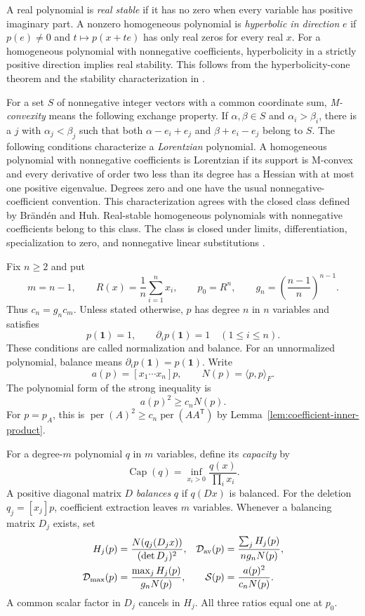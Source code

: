 \documentclass[11pt,a4paper]{article}
\theoremstyle{definition}
\theoremstyle{remark}
\newcommand{\per}{\operatorname{per}}
\newcommand{\T}{\mathsf{T}}
\begin{document}
A real polynomial is \emph{real stable} if it has no zero when every variable has positive imaginary part.
A nonzero homogeneous polynomial is \emph{hyperbolic in direction} $e$ if $p(e)\ne0$ and $t\mapsto p(x+te)$ has only real zeros for every real $x$.
For a homogeneous polynomial with nonnegative coefficients, hyperbolicity in a strictly positive direction implies real stability.
This follows from the hyperbolicity-cone theorem and the stability characterization in \citet[Proposition~4.4 and Theorem~4.5]{borcea-branden-liggett2009}.

For a set $S$ of nonnegative integer vectors with a common coordinate sum, \emph{M-convexity} means the following exchange property.
If $\alpha,\beta\in S$ and $\alpha_i>\beta_i$, there is a $j$ with $\alpha_j<\beta_j$ such that both $\alpha-e_i+e_j$ and $\beta+e_i-e_j$ belong to $S$.
The following conditions characterize a \emph{Lorentzian} polynomial.
A homogeneous polynomial with nonnegative coefficients is Lorentzian if its support is M-convex and every derivative of order two less than its degree has a Hessian with at most one positive eigenvalue.
Degrees zero and one have the usual nonnegative-coefficient convention.
This characterization agrees with the closed class defined by Br\"and\'en and Huh.
Real-stable homogeneous polynomials with nonnegative coefficients belong to this class.
The class is closed under limits, differentiation, specialization to zero, and nonnegative linear substitutions \cite[Theorems~2.10 and 2.25]{brandenhuh2020}.

Fix $n\ge2$ and put
\[
 m=n-1,\qquad R(x)=\frac1n\sum_{i=1}^nx_i,\qquad
 p_0=R^n,\qquad g_n=\left(\frac{n-1}{n}\right)^{n-1}.
\]
Thus $c_n=g_nc_m$.
Unless stated otherwise, $p$ has degree $n$ in $n$ variables and satisfies
\begin{equation}\label{eq:lp-balance}
 p(\mathbf1)=1,\qquad \partial_i p(\mathbf1)=1\quad(1\le i\le n).
\end{equation}
These conditions are called normalization and balance.
For an unnormalized polynomial, balance means $\partial_i p(\mathbf1)=p(\mathbf1)$.
Write
\[
 a(p)=[x_1\cdots x_n]p,\qquad N(p)=\langle p,p\rangle_F.
\]
The polynomial form of the strong inequality is
\begin{equation}\label{eq:lp-target}
 a(p)^2\ge c_nN(p).
\end{equation}
For $p=p_A$, this is $\per(A)^2\ge c_n\per(AA^\T)$ by Lemma~\ref{lem:coefficient-inner-product}.

For a degree-$m$ polynomial $q$ in $m$ variables, define its \emph{capacity} by
\[
 \operatorname{Cap}(q)=\inf_{x_i>0}\frac{q(x)}{\prod_i x_i}.
\]
A positive diagonal matrix $D$ \emph{balances} $q$ if $q(Dx)$ is balanced.
For the deletion $q_j=[x_j]p$, coefficient extraction leaves $m$ variables.
Whenever a balancing matrix $D_j$ exists, set
\[
 \begin{aligned}
 H_j(p)&=\frac{N(q_j(D_jx))}{(\det D_j)^2},&
 \mathcal D_{\rm av}(p)&=\frac{\sum_jH_j(p)}{ng_nN(p)},\\
 \mathcal D_{\max}(p)&=\frac{\max_jH_j(p)}{g_nN(p)},&
 \mathcal S(p)&=\frac{a(p)^2}{c_nN(p)}.
 \end{aligned}
\]
A common scalar factor in $D_j$ cancels in $H_j$.
All three ratios equal one at $p_0$.
\end{document}
